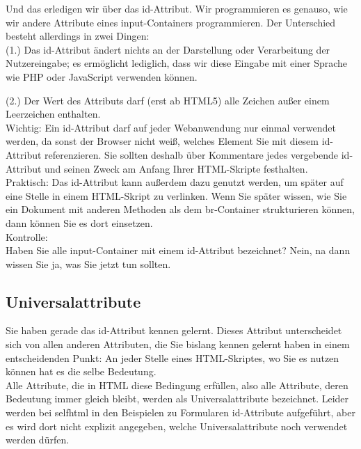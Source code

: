 Und das erledigen wir über das id-Attribut. Wir programmieren es genauso, wie wir andere Attribute eines input-Containers programmieren. Der Unterschied besteht allerdings in zwei Dingen:\\

(1.)	Das id-Attribut ändert nichts an der Darstellung oder Verarbeitung der Nutzereingabe; es ermöglicht lediglich, dass wir diese Eingabe mit einer Sprache wie PHP oder JavaScript verwenden können.

(2.)	Der Wert des Attributs darf (erst ab HTML5) alle Zeichen außer einem Leerzeichen enthalten.\\

Wichtig: Ein id-Attribut darf auf jeder Webanwendung nur einmal verwendet werden, da sonst der Browser nicht weiß, welches Element Sie mit diesem id-Attribut referenzieren. Sie sollten deshalb über Kommentare jedes vergebende id-Attribut und seinen Zweck am Anfang Ihrer HTML-Skripte festhalten.\\

Praktisch: Das id-Attribut kann außerdem dazu genutzt werden, um später auf eine Stelle in einem HTML-Skript zu verlinken. Wenn Sie später wissen, wie Sie ein Dokument mit anderen Methoden als dem br-Container strukturieren können, dann können Sie es dort einsetzen.\\

Kontrolle:\\

Haben Sie alle input-Container mit einem id-Attribut bezeichnet? Nein, na dann wissen Sie ja, was Sie jetzt tun sollten.

\subsection{Universalattribute}

Sie haben gerade das id-Attribut kennen gelernt. Dieses Attribut unterscheidet sich von allen anderen Attributen, die Sie bislang kennen gelernt haben in einem entscheidenden Punkt: An jeder Stelle eines HTML-Skriptes, wo Sie es nutzen können hat es die selbe Bedeutung.\\

Alle Attribute, die in HTML diese Bedingung erfüllen, also alle Attribute, deren Bedeutung immer gleich bleibt, werden als Universalattribute bezeichnet. Leider werden bei selfhtml in den Beispielen zu Formularen id-Attribute aufgeführt, aber es wird dort nicht explizit angegeben, welche Universalattribute noch verwendet werden dürfen.


